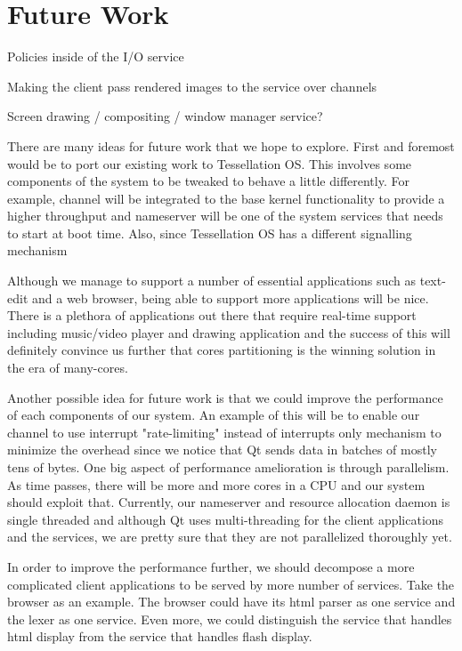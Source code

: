 \documentclass[letterpaper,twocolumn,10pt]{article}
\begin{document}
\section{Future Work}

Policies inside of the I/O service

Making the client pass rendered images to the service over channels

Screen drawing / compositing / window manager service?

There are many ideas for future work that we hope to explore. First and foremost would be to port our existing work to Tessellation OS. This involves some components of the system to be tweaked to behave a little differently. For example, channel will be integrated to the base kernel functionality to provide a higher throughput and nameserver will be one of the system services that needs to start at boot time. Also, since Tessellation OS has a different signalling mechanism 

Although we manage to support a number of essential applications such as text-edit and a web browser, being able to support more applications will be nice. There is a plethora of applications out there that require real-time support including music/video player and drawing application and the success of this will definitely convince us further that cores partitioning is the winning solution in the era of many-cores.

Another possible idea for future work is that we could improve the performance of each components of our system. An example of this will be to enable our channel to use interrupt "rate-limiting" instead of interrupts only mechanism to minimize the overhead since we notice that Qt sends data in batches of mostly tens of bytes. One big aspect of performance amelioration is through parallelism. As time passes, there will be more and more cores in a CPU and our system should exploit that. Currently, our nameserver and resource allocation daemon is single threaded and although Qt uses multi-threading for the client applications and the services, we are pretty sure that they are not parallelized thoroughly yet. 

In order to improve the performance further, we should decompose a more complicated client applications to be served by more number of services. Take the browser as an example. The browser could have its html parser as one service and the lexer as one service. Even more, we could distinguish the service that handles html display from the service that handles flash display.
\end{document}
